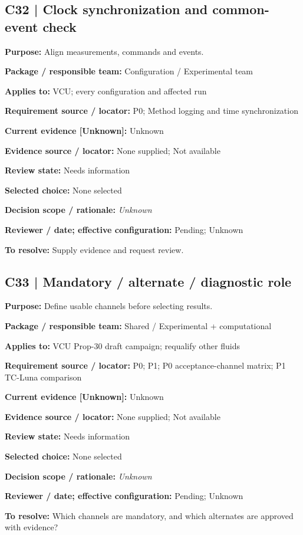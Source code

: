 \documentclass[11pt]{article}
\begin{document}
\par\noindent\begin{minipage}{\textwidth}\small\setlength{\parskip}{2pt}
\subsection*{C32 | Clock synchronization and common-event check}
\textbf{Purpose:} Align measurements, commands and events.\par
\textbf{Package / responsible team:} Configuration / Experimental team\par
\textbf{Applies to:} VCU; every configuration and affected run\par
\textbf{Requirement source / locator:} P0; Method logging and time synchronization\par
\textbf{Current evidence [Unknown]:} Unknown\par
\textbf{Evidence source / locator:} None supplied; Not available\par
\textbf{Review state:} Needs information\par
\textbf{Selected choice:} None selected\par
\textbf{Decision scope / rationale:} \textit{Unknown}\par
\textbf{Reviewer / date; effective configuration:} Pending; Unknown\par
\textbf{To resolve:} Supply evidence and request review.\par
\end{minipage}\par\vspace{5pt}
\par\noindent\begin{minipage}{\textwidth}\small\setlength{\parskip}{2pt}
\subsection*{C33 | Mandatory / alternate / diagnostic role}
\textbf{Purpose:} Define usable channels before selecting results.\par
\textbf{Package / responsible team:} Shared / Experimental + computational\par
\textbf{Applies to:} VCU Prop-30 draft campaign; requalify other fluids\par
\textbf{Requirement source / locator:} P0; P1; P0 acceptance-channel matrix; P1 TC-Luna comparison\par
\textbf{Current evidence [Unknown]:} Unknown\par
\textbf{Evidence source / locator:} None supplied; Not available\par
\textbf{Review state:} Needs information\par
\textbf{Selected choice:} None selected\par
\textbf{Decision scope / rationale:} \textit{Unknown}\par
\textbf{Reviewer / date; effective configuration:} Pending; Unknown\par
\textbf{To resolve:} Which channels are mandatory, and which alternates are approved with evidence?\par
\end{minipage}\par\vspace{5pt}
\end{document}
